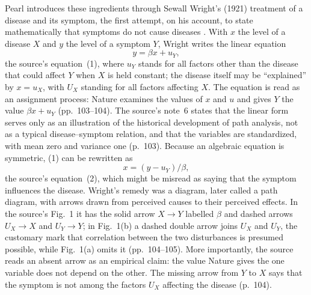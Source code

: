 Pearl introduces these ingredients through Sewall Wright's (1921)
treatment of a disease and its symptom, the first attempt, on his account,
to state mathematically that symptoms do not cause diseases
\cite[sec.~3.1, pp.~103--105]{Pearl2009CausalOverview}. With \(x\) the
level of a disease \(X\) and \(y\) the level of a symptom \(Y\), Wright
writes the linear equation
\[
 y=\beta x+u_Y,
\]
the source's equation~(1), where \(u_Y\) stands for all factors other
than the disease that could affect \(Y\) when \(X\) is held constant; the
disease itself may be ``explained'' by \(x=u_X\), with \(U_X\) standing
for all factors affecting \(X\). The equation is read as an assignment
process: Nature examines the values of \(x\) and \(u\) and gives \(Y\) the
value \(\beta x+u_Y\) (pp.~103--104). The source's note~6 states that the
linear form serves only as an illustration of the historical development
of path analysis, not as a typical disease--symptom relation, and that the
variables are standardized, with mean zero and variance one (p.~103).
Because an algebraic equation is symmetric, (1) can be rewritten as
\[
 x=(y-u_Y)/\beta,
\]
the source's equation~(2), which might be misread as saying that the
symptom influences the disease. Wright's remedy was a diagram, later
called a path diagram, with arrows drawn from perceived causes to their
perceived effects. In the source's Fig.~1 it has the solid arrow
\(X\to Y\) labelled \(\beta\) and dashed arrows \(U_X\to X\) and
\(U_Y\to Y\); in Fig.~1(b) a dashed double arrow joins \(U_X\) and
\(U_Y\), the customary mark that correlation between the two disturbances
is presumed possible, while Fig.~1(a) omits it (pp.~104--105). More
importantly, the source reads an absent arrow as an empirical claim: the
value Nature gives the one variable does not depend on the other. The missing arrow from
\(Y\) to \(X\) says that the symptom is not among the factors \(U_X\)
affecting the disease (p.~104).

